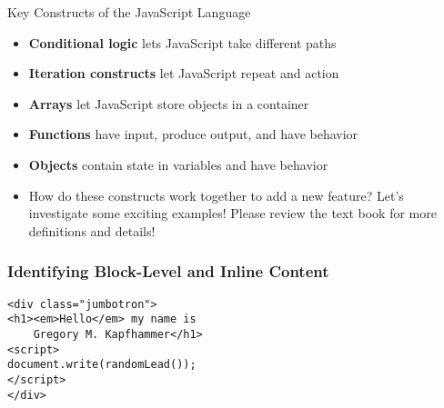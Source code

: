 \documentclass[14pt,aspectratio=169]{beamer}
\begin{document}
%
\begin{frame}{Key Constructs of the JavaScript Language}
  \begin{itemize}
    \item {\bf Conditional logic} lets JavaScript take different paths
      \vspace*{-.15in}
    \item {\bf Iteration constructs} let JavaScript repeat and action
      \vspace*{-.15in}
    \item {\bf Arrays} let JavaScript store objects in a container
      \vspace*{-.15in}
    \item {\bf Functions} have input, produce output, and have behavior
      \vspace*{-.15in}
    \item {\bf Objects} contain state in variables and have behavior
      \vspace*{-.15in}
    \item How do these constructs work together to add a new feature? Let's
      investigate some exciting examples! Please review the text book for more
      definitions and details!
      \vspace*{-.15in}
  \end{itemize}
\end{frame}

%
\begin{frame}[fragile]
  \frametitle{Identifying Block-Level and Inline Content}
  \normalsize
  \begin{minipage}{6in}
    \vspace*{.1in}
    \begin{verbatim}
<div class="jumbotron">
<h1><em>Hello</em> my name is
    Gregory M. Kapfhammer</h1>
<script>
document.write(randomLead());
</script>
</div>
    \end{verbatim}
  \end{minipage}
%
\end{frame}
\end{document}
